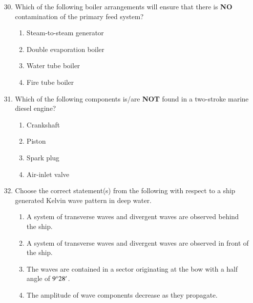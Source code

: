 \documentclass[journal]{IEEEtran}
\theoremstyle{remark}
\begin{document}
\begin{enumerate}[itemsep=1em]
\setcounter{enumi}{29}
\item Which of the following boiler arrangements will ensure that there is \textbf{NO} contamination of the primary feed system? 
\begin{enumerate}[leftmargin=2.5em, labelsep=0.5em, itemsep=0.5em]
    \item Steam-to-steam generator
    \item Double evaporation boiler
    \item Water tube boiler
    \item Fire tube boiler
\end{enumerate}
\end{enumerate}

\begin{enumerate}[itemsep=1em]
\setcounter{enumi}{30}
\item Which of the following components is/are \textbf{NOT} found in a two-stroke marine diesel engine? 
\begin{multicols}{4}
\begin{enumerate}
    \item Crankshaft 
    \item Piston
    \item Spark plug
    \item Air-inlet valve
\end{enumerate}
\end{multicols}
\end{enumerate}

\begin{enumerate}[itemsep=1em]
\setcounter{enumi}{31}
\item Choose the correct statement(s) from the following with respect to a ship generated Kelvin wave pattern in deep water. 
\newpage
\vspace*{0.25cm}
\begin{enumerate}[leftmargin=2.5em, labelsep=0.5em, itemsep=0.5em]
    \item A system of transverse waves and divergent waves are observed behind the ship.
    \item A system of transverse waves and divergent waves are observed in front of the ship.
    \item The waves are contained in a sector originating at the bow with a half angle of $9\degree 28'$.
    \item The amplitude of wave components decrease as they propagate. 
\end{enumerate}
\end{enumerate}
\end{document}
